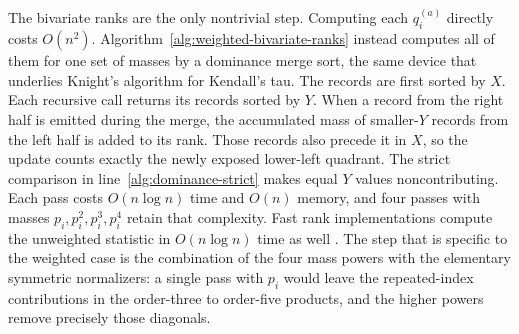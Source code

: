 The bivariate ranks are the only nontrivial step. Computing each $q_i^{(a)}$
directly costs $O(n^2)$. Algorithm~\ref{alg:weighted-bivariate-ranks} instead
computes all of them for one set of masses by a dominance merge sort, the same
device that underlies Knight's algorithm for Kendall's tau. The records are
first sorted by $X$. Each recursive call returns its records sorted by $Y$.
When a record from the right half is emitted during the merge, the accumulated
mass of smaller-$Y$ records from the left half is added to its rank. Those
records also precede it in $X$, so the update counts exactly the newly exposed
lower-left quadrant. The strict comparison in line~\ref{alg:dominance-strict}
makes equal $Y$ values noncontributing. Each pass costs $O(n\log n)$ time and
$O(n)$ memory, and four passes with masses $p_i,p_i^2,p_i^3,p_i^4$ retain
that complexity. Fast rank implementations compute the unweighted statistic in
$O(n\log n)$ time as well \citep{evenzohar2020}. The step that is specific to
the weighted case is the combination of the four mass powers with the
elementary symmetric normalizers: a single pass with $p_i$ would leave the
repeated-index contributions in the order-three to order-five products, and
the higher powers remove precisely those diagonals.

